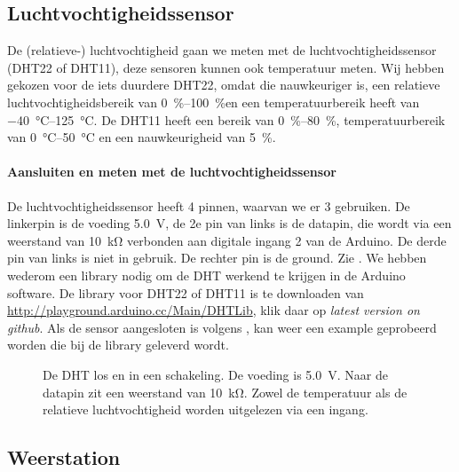 \subsection{Luchtvochtigheidssensor}

De (relatieve-) luchtvochtigheid gaan we meten met de
luchtvochtigheidssensor (DHT22 of DHT11), deze sensoren kunnen ook
temperatuur meten. Wij hebben gekozen voor de iets duurdere DHT22, omdat
die nauwkeuriger is, een relatieve luchtvochtigheidsbereik van
\SIrange{0}{100}{\percent}en een temperatuurbereik heeft van
\SIrange{-40}{125}{\degreeCelsius}. De DHT11 heeft een bereik 
van \SIrange{0}{80}{\percent}, temperatuurbereik van \SIrange{0}{50}{\degreeCelsius} 
en een nauwkeurigheid van \SI{5}{\percent}.

\paragraph{Aansluiten en meten met de luchtvochtigheidssensor}

De luchtvochtigheidssensor heeft 4 pinnen, waarvan we er 3 gebruiken. De
linkerpin is de voeding \SI{5.0}{\volt}, de 2e pin van links is de
datapin, die wordt via een weerstand van \SI{10}{\kilo\ohm} verbonden
aan digitale ingang 2 van de Arduino. De derde pin van links is niet in
gebruik. De rechter pin is de ground. Zie . We hebben
wederom een library nodig om de DHT werkend te krijgen in de Arduino
software. De library voor DHT22 of DHT11 is te downloaden van
\url{http://playground.arduino.cc/Main/DHTLib}, klik daar op
\emph{latest version on github}. Als de sensor aangesloten is volgens
, kan weer een example geprobeerd
worden die bij de library geleverd wordt.

\begin{figure}
    \centering
    \hfill
    \caption{De DHT los en in een schakeling. De voeding is \SI{5.0}{\volt}. 
    Naar de datapin zit een weerstand van \SI{10}{\kilo\ohm}. Zowel de
    temperatuur als de relatieve luchtvochtigheid worden uitgelezen via
    een ingang.}
\end{figure}

\subsection{Weerstation}

